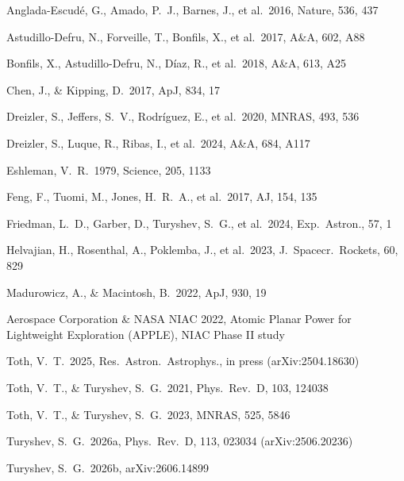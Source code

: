 \documentclass[twocolumn,10pt]{article}
\begin{document}
\begin{thebibliography}{}

Anglada-Escud\'e, G., Amado, P.~J., Barnes, J., et al.\ 2016, Nature, 536, 437

Astudillo-Defru, N., Forveille, T., Bonfils, X., et al.\ 2017, A\&A, 602, A88

Bonfils, X., Astudillo-Defru, N., D\'iaz, R., et al.\ 2018, A\&A, 613, A25

Chen, J., \& Kipping, D.\ 2017, ApJ, 834, 17

Dreizler, S., Jeffers, S.~V., Rodr\'iguez, E., et al.\ 2020, MNRAS, 493, 536

Dreizler, S., Luque, R., Ribas, I., et al.\ 2024, A\&A, 684, A117

Eshleman, V.~R.\ 1979, Science, 205, 1133

Feng, F., Tuomi, M., Jones, H.~R.~A., et al.\ 2017, AJ, 154, 135

Friedman, L.~D., Garber, D., Turyshev, S.~G., et al.\ 2024, Exp.\ Astron., 57, 1

Helvajian, H., Rosenthal, A., Poklemba, J., et al.\ 2023, J.\ Spacecr.\ Rockets, 60, 829

Madurowicz, A., \& Macintosh, B.\ 2022, ApJ, 930, 19

Aerospace Corporation \& NASA NIAC 2022, Atomic Planar Power for Lightweight Exploration (APPLE), NIAC Phase II study

Toth, V.~T.\ 2025, Res.\ Astron.\ Astrophys., in press (arXiv:2504.18630)

Toth, V.~T., \& Turyshev, S.~G.\ 2021, Phys.\ Rev.\ D, 103, 124038

Toth, V.~T., \& Turyshev, S.~G.\ 2023, MNRAS, 525, 5846

Turyshev, S.~G.\ 2026a, Phys.\ Rev.\ D, 113, 023034 (arXiv:2506.20236)

Turyshev, S.~G.\ 2026b, arXiv:2606.14899


\end{thebibliography}
\end{document}
